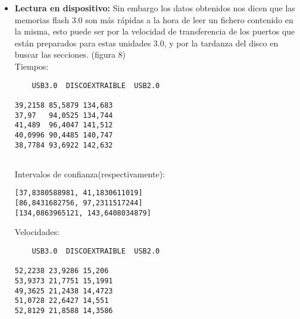 \documentclass[a4paper, 10pt]{article} %
\begin{document}
\begin{itemize}
\begin{itemize}
\begin{itemize}
\begin{verbatim}
9,10922	28,0367	8,07319
8,6017	32,2133	7,56734
8,53266	32,373	6,83589
8,45218	33,1949	6,98795
8,44954	30,1292	6,50812

	\end{verbatim}
	Intervalos de confianza(respectivamente): 
	\begin{verbatim}
[8,2866954294, 8,9714245706]
[28,5897085763, 33,7891314237]
[6,4206993818, 7,9682966182]
	\end{verbatim}
	\begin{figure}[H]
	\centering 
	\texttt{[image: e1e]} 
	\caption{Gráfica de Tiempo de escritura.} 
	\label{contexto:figura} 
	\end{figure}
	\begin{figure}[H]
	\centering 
	\texttt{[image: e1ve]} 
	\caption{Gráfica de Velocidad de escritura.} 
	\label{contexto:figura} 
	\end{figure}
	\item \textbf{Lectura en dispositivo:} Sin embargo los datos obtenidos nos dicen que las memorias flash 3.0 son más rápidas a la hora de leer un fichero contenido en la misma, esto puede ser por la velocidad de transferencia de los puertos que están preparados para estas unidades 3.0, y por la tardanza del disco en buscar las secciones. (figura 8)\\
	Tiempos:
	\begin{verbatim}
	USB3.0	DISCOEXTRAIBLE	USB2.0
	
39,2158	85,5879	134,683
37,97	94,0525	134,744
41,489	96,4047	141,512
40,0996	90,4485	140,747
38,7784	93,6922	142,632


	\end{verbatim}
	Intervalos de confianza(respectivamente): 
	\begin{verbatim}
[37,8380588981, 41,1830611019]
[86,8431682756, 97,2311517244]
[134,0863965121, 143,6408034879]

	\end{verbatim}
	Velocidades:
	\begin{verbatim}
	USB3.0	DISCOEXTRAIBLE	USB2.0
	
52,2238	23,9286	15,206
53,9373	21,7751	15,1991
49,3625	21,2438	14,4723
51,0728	22,6427	14,551
52,8129	21,8588	14,3586



\end{verbatim}
\end{itemize}
\end{itemize}
\end{itemize}
\end{document}

